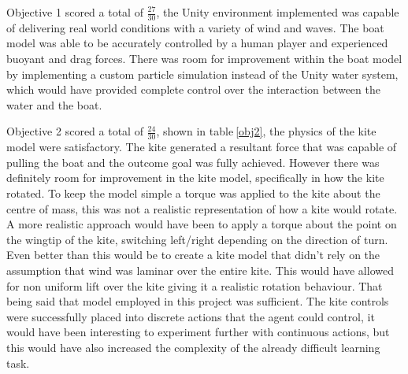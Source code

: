 Objective 1 scored a total of $\frac{27}{30}$, the Unity environment implemented was capable of delivering real world conditions with a variety of wind and waves. The boat model was able to be accurately controlled by a human player and experienced buoyant and drag forces. There was room for improvement within the boat model by implementing a custom particle simulation instead of the Unity water system, which would have provided complete control over the interaction between the water and the boat. 

\begin{table}[!htb]
    \centering
    \caption{Objective 2 Evaluation}\label{obj2}
\end{table}

Objective 2 scored a total of $\frac{24}{30}$, shown in table$~$\ref{obj2}, the physics of the kite model were satisfactory. The kite generated a resultant force that was capable of pulling the boat and the outcome goal was fully achieved. However there was definitely room for improvement in the kite model, specifically in how the kite rotated. To keep the model simple a torque was applied to the kite about the centre of mass, this was not a realistic representation of how a kite would rotate. A more realistic approach would have been to apply a torque about the point on the wingtip of the kite, switching left/right depending on the direction of turn. Even better than this would be to create a kite model that didn't rely on the assumption that wind was laminar over the entire kite. This would have allowed for non uniform lift over the kite giving it a realistic rotation behaviour. That being said that model employed in this project was sufficient. The kite controls were successfully placed into discrete actions that the agent could control, it would have been interesting to experiment further with continuous actions, but this would have also increased the complexity of the already difficult learning task.

